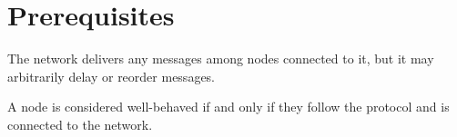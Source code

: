 \section{Prerequisites}

\begin{defn}[Network]\label{defn_network}
    The network delivers any messages among nodes connected to it, but it may arbitrarily delay or reorder messages.
\end{defn}

\begin{defn}
    A node is considered well-behaved if and only if they follow the protocol and is connected to the network.
\end{defn}


